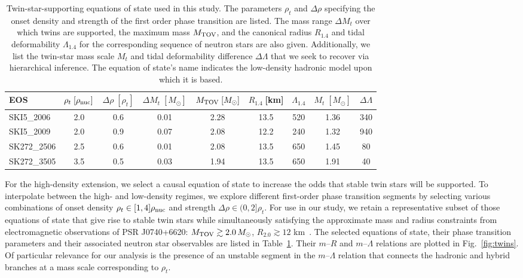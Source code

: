 \documentclass[aps,prd,twocolumn,superscriptaddress,nofootinbib]{revtex4-1}
\newcommand{\Msun}{\ensuremath{\,M_{\odot}}}
\begin{document}
\begin{table}[t]
    \centering
    \begin{tabular}{lcccccccc}
    \hline \hline
    EOS & $\rho_t\;[\rho_{\rm nuc}]$ & $\Delta\rho\;[\rho_{t}]$ & $\Delta M_{t}\;[M_{\odot}]$ & $M_{\rm TOV}\;[M_{\odot}]$ & $R_{1.4}\;$[km] & $\Lambda_{1.4}$ & $M_t\;[M_{\odot}]$ & $\Delta\Lambda$ \\ \hline    
     SKI5\_2006 & 2.0 & 0.6 & 0.01 & 2.28 & 13.5 & 520  & 1.36 & 340 \\
     SKI5\_2009 & 2.0 & 0.9 & 0.07 & 2.08 & 12.2 & 240 & 1.32 & 940 \\
     SK272\_2506 & 2.5 & 0.6 & 0.01 & 2.08 & 13.5 & 650 & 1.45 & 80 \\ 
     SK272\_3505 & 3.5 & 0.5 & 0.03 & 1.94 & 13.5 & 650 & 1.91 & 40 \\ \hline \hline
    \end{tabular}
    \caption{Twin-star-supporting equations of state used in this study. The parameters $\rho_t$ and $\Delta\rho$ specifying the onset density and strength of the first order phase transition are listed. The mass range $\Delta M_t$ over which twins are supported, the maximum mass $M_{\rm TOV}$, and the canonical radius $R_{1.4}$ and tidal deformability $\Lambda_{1.4}$ for the corresponding sequence of neutron stars are also given. Additionally, we list the twin-star mass scale $M_t$ and tidal deformability difference $\Delta\Lambda$ that we seek to recover via hierarchical inference. The equation of state's name indicates the low-density hadronic model upon which it is based.}
    \label{tab:eos}
\end{table}

For the high-density extension, we select a causal equation of state to increase the odds that stable twin stars will be supported. To interpolate between the high- and low-density regimes, we explore different first-order phase transition segments by selecting various combinations of onset density $\rho_t \in [1, 4]\rho_{\rm nuc}$ and strength $\Delta\rho \in (0,2]\rho_t$. For use in our study, we retain a representative subset of those equations of state that give rise to stable twin stars while simultaneously satisfying the approximate mass and radius constraints from electromagnetic observations of PSR J0740+6620: $M_{\rm TOV} \gtrsim 2.0\Msun$, $R_{2.0} \gtrsim 12$ km~\cite{MillerLamb2021}. The selected equations of state, their phase transition parameters and their associated neutron star observables are listed in Table~\ref{tab:eos}. Their $m$--$R$ and $m$--$\Lambda$ relations are plotted in Fig.~\ref{fig:twins}. Of particular relevance for our analysis is the presence of an unstable segment in the $m$--$\Lambda$ relation that connects the hadronic and hybrid branches at a mass scale corresponding to $\rho_t$.
\end{document}
